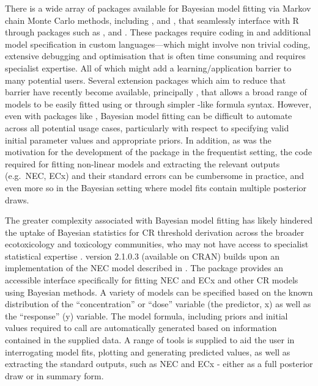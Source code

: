 \documentclass[
  shortnames]{jss}
\begin{document}
There is a wide array of packages available for Bayesian model fitting via Markov chain Monte Carlo methods, including  \citep{Lunn2000},  \citep{Plummer2003} and  \citep{Carpenter2017}, that seamlessly interface with R through packages such as ,  \citep{Su2015} and  \citep{rstan2021}. These packages require coding in  and additional model specification in custom languages---which might involve non trivial coding, extensive debugging and optimisation that is often time consuming and requires specialist expertise. All of which might add a learning/application barrier to many potential users. Several extension packages which aim to reduce that barrier have recently become available, principally  \citep{Burkner2017}, that allows a broad range of models to be easily fitted using \citep{rstan2021} or  \citep{cmdstanr2022} through simpler -like formula syntax. However, even with packages like , Bayesian model fitting can be difficult to automate across all potential usage cases, particularly with respect to specifying valid initial parameter values and appropriate priors. In addition, as was the motivation for the development of the  package in the frequentist setting, the  code required for fitting non-linear models and extracting the relevant outputs (e.g.~NEC, ECx) and their standard errors can be cumbersome in practice, and even more so in the Bayesian setting where model fits contain multiple posterior draws.

The greater complexity associated with Bayesian model fitting has likely hindered the uptake of Bayesian statistics for CR threshold derivation across the broader ecotoxicology and toxicology communities, who may not have access to specialist statistical expertise \citep{Fisher2019}.  version 2.1.0.3 (available on CRAN) builds upon an implementation of the NEC model described in \citep{Fox2010, Pires2002}. The  package provides an accessible interface specifically for fitting NEC and ECx and other CR models using Bayesian methods. A variety of models can be specified based on the known distribution of the ``concentration'' or ``dose'' variable (the predictor, x) as well as the ``response'' (y) variable. The model formula, including priors and initial values required to call  are automatically generated based on information contained in the supplied data. A range of tools is supplied to aid the user in interrogating model fits, plotting and generating predicted values, as well as extracting the standard outputs, such as NEC and ECx - either as a full posterior draw or in summary form.
\end{document}
